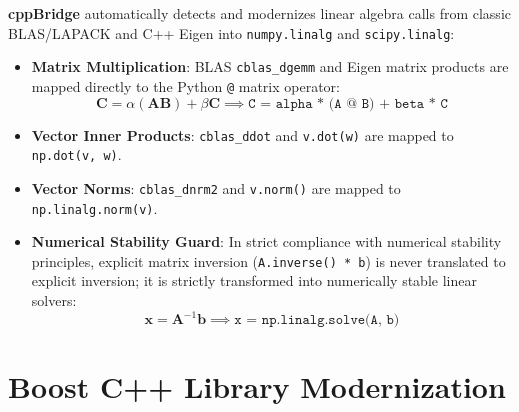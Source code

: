 \documentclass[11pt,a4paper]{article}
\theoremstyle{definition}
\begin{document}
\textbf{cppBridge} automatically detects and modernizes linear algebra calls from classic BLAS/LAPACK and C++ Eigen into \texttt{numpy.linalg} and \texttt{scipy.linalg}:
\begin{itemize}
    \item \textbf{Matrix Multiplication}: BLAS \texttt{cblas\_dgemm} and Eigen matrix products are mapped directly to the Python \texttt{@} matrix operator:
    \begin{equation}
        \mathbf{C} = \alpha (\mathbf{A} \mathbf{B}) + \beta \mathbf{C} \implies \texttt{C = alpha * (A @ B) + beta * C}
    \end{equation}
    \item \textbf{Vector Inner Products}: \texttt{cblas\_ddot} and \texttt{v.dot(w)} are mapped to \texttt{np.dot(v, w)}.
    \item \textbf{Vector Norms}: \texttt{cblas\_dnrm2} and \texttt{v.norm()} are mapped to \texttt{np.linalg.norm(v)}.
    \item \textbf{Numerical Stability Guard}: In strict compliance with numerical stability principles, explicit matrix inversion (\texttt{A.inverse() * b}) is never translated to explicit inversion; it is strictly transformed into numerically stable linear solvers:
    \begin{equation}
        \mathbf{x} = \mathbf{A}^{-1} \mathbf{b} \implies \texttt{x = np.linalg.solve(A, b)}
    \end{equation}
\end{itemize}

\section{Boost C++ Library Modernization}
\end{document}
